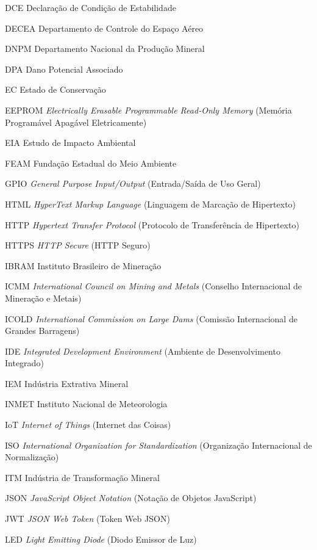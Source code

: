 \begin{siglas}
    \item[DCE] Declaração de Condição de Estabilidade
    \item[DECEA] Departamento de Controle do Espaço Aéreo
    \item[DNPM] Departamento Nacional da Produção Mineral
    \item[DPA] Dano Potencial Associado
    \item[EC] Estado de Conservação
    \item[EEPROM] \textit{Electrically Erasable Programmable Read-Only Memory} (Memória Programável Apagável Eletricamente)
    \item[EIA] Estudo de Impacto Ambiental
    \item[FEAM] Fundação Estadual do Meio Ambiente
    \item[GPIO] \textit{General Purpose Input/Output} (Entrada/Saída de Uso Geral)
    \item[HTML] \textit{HyperText Markup Language} (Linguagem de Marcação de Hipertexto)
    \item[HTTP] \textit{Hypertext Transfer Protocol} (Protocolo de Transferência de Hipertexto)
    \item[HTTPS] \textit{HTTP Secure} (HTTP Seguro)
    \item[IBRAM] Instituto Brasileiro de Mineração
    \item[ICMM] \textit{International Council on Mining and Metals} (Conselho Internacional de Mineração e Metais)
    \item[ICOLD] \textit{International Commission on Large Dams} (Comissão Internacional de Grandes Barragens)
    \item[IDE] \textit{Integrated Development Environment} (Ambiente de Desenvolvimento Integrado)
    \item[IEM] Indústria Extrativa Mineral
    \item[INMET] Instituto Nacional de Meteorologia
    \item[IoT] \textit{Internet of Things} (Internet das Coisas)
    \item[ISO] \textit{International Organization for Standardization} (Organização Internacional de Normalização)
    \item[ITM] Indústria de Transformação Mineral
    \item[JSON] \textit{JavaScript Object Notation} (Notação de Objetos JavaScript)
    \item[JWT] \textit{JSON Web Token} (Token Web JSON)
    \item[LED] \textit{Light Emitting Diode} (Diodo Emissor de Luz)

\end{siglas}
